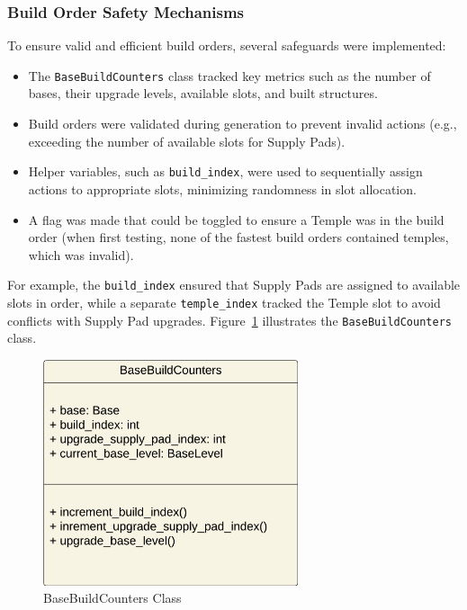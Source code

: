 \documentclass[a4paper, 12pt, english]{article}
\begin{document}
\subsubsection{Build Order Safety Mechanisms}
To ensure valid and efficient build orders, several safeguards were implemented:
\begin{itemize}
    \item The \texttt{BaseBuildCounters} class tracked key metrics such as the number of bases, their upgrade levels, available slots, and built structures.
    \item Build orders were validated during generation to prevent invalid actions (e.g., exceeding the number of available slots for Supply Pads).
    \item Helper variables, such as \texttt{build\_index}, were used to sequentially assign actions to appropriate slots, minimizing randomness in slot allocation.
    \item A flag was made that could be toggled to ensure a Temple was in the build order (when first testing, none of the fastest build orders contained temples, which was invalid).
\end{itemize}

For example, the \texttt{build\_index} ensured that Supply Pads are assigned to available slots in order, while a separate \texttt{temple\_index} tracked the Temple slot to avoid conflicts with Supply Pad upgrades. Figure~\ref{fig:BaseBuildCountersClass} illustrates the \texttt{BaseBuildCounters} class.

\begin{figure}[!ht]
    \begin{center}
        \includegraphics[width=75mm,scale=1.0]{HaloWarsDiagramBaseBuildCounters.png}
    \end{center}
    \caption{\label{fig:BaseBuildCountersClass}BaseBuildCounters Class}
\end{figure}
\end{document}

